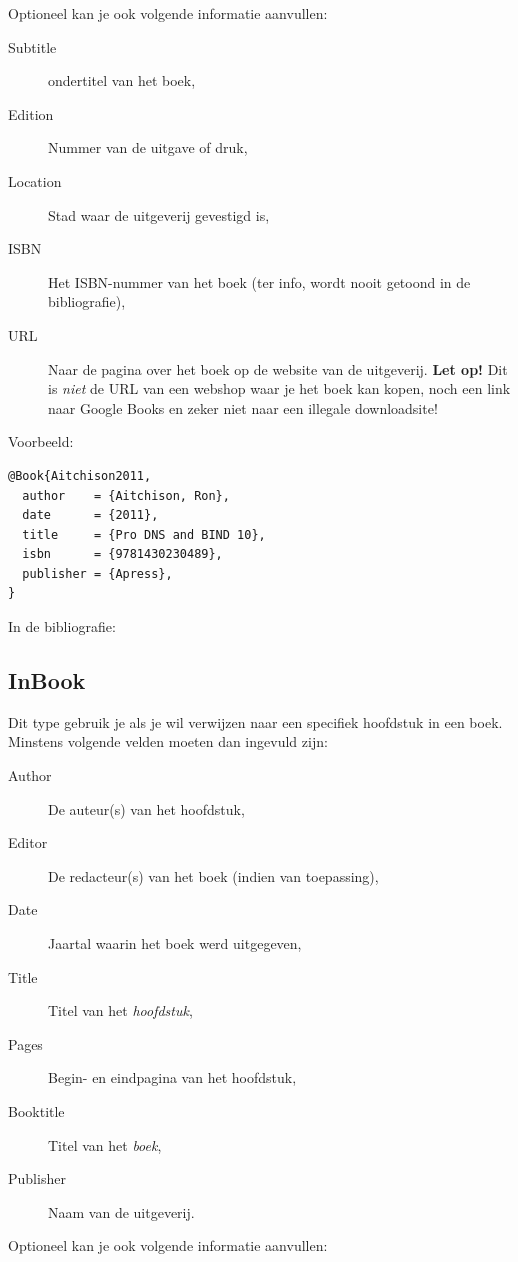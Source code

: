 Optioneel kan je ook volgende informatie aanvullen:

\begin{description}
  \item[Subtitle] ondertitel van het boek,
  \item[Edition] Nummer van de uitgave of druk,
  \item[Location] Stad waar de uitgeverij gevestigd is,
  \item[ISBN] Het ISBN-nummer van het boek (ter info, wordt nooit getoond in de bibliografie),
  \item[URL] Naar de pagina over het boek op de website van de uitgeverij. \textbf{Let op!} Dit is \emph{niet} de URL van een webshop waar je het boek kan kopen, noch een link naar Google Books en zeker niet naar een illegale downloadsite!
\end{description}

Voorbeeld:
\begin{verbatim}
@Book{Aitchison2011,
  author    = {Aitchison, Ron},
  date      = {2011},
  title     = {Pro DNS and BIND 10},
  isbn      = {9781430230489},
  publisher = {Apress},
}
\end{verbatim}

In de bibliografie:

\subsection{InBook}%
\label{ssec:inbook}

Dit type gebruik je als je wil verwijzen naar een specifiek hoofdstuk in een boek. Minstens volgende velden moeten dan ingevuld zijn:

\begin{description}
  \item[Author] De auteur(s) van het hoofdstuk,
  \item[Editor] De redacteur(s) van het boek (indien van toepassing),
  \item[Date] Jaartal waarin het boek werd uitgegeven,
  \item[Title] Titel van het \emph{hoofdstuk},
  \item[Pages] Begin- en eindpagina van het hoofdstuk,
  \item[Booktitle] Titel van het \emph{boek},
  \item[Publisher] Naam van de uitgeverij.
\end{description}

Optioneel kan je ook volgende informatie aanvullen:

